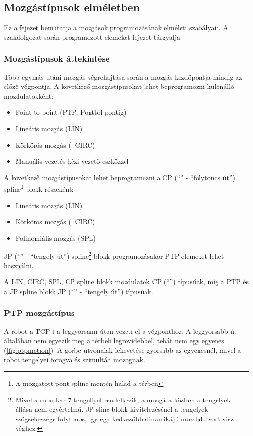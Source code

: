 \documentclass[../documentation.tex]{subfiles}
\begin{document}
\subsection{Mozgástípusok elméletben}
Ez a fejezet bemutatja a mozgások programozásának elméleti szabályait. A szakdolgozat során programozott elemeket  fejezet tárgyalja.

\subsubsection{Mozgástípusok áttekintése}
Több egymás utáni mozgás végrehajtása során a mozgás kezdőpontja mindig az előző végpontja.
A következő mozgástípusokat lehet beprogramozni különálló mozdulatokként:
\begin{itemize}
	\item Point-to-point (PTP, Ponttól pontig)
	\item Lineáris mozgás (LIN)
	\item Körkörös mozgás (, CIRC)
	\item Manuális vezetés kézi vezető eszközzel
\end{itemize}

A következő mozgástípusokat lehet beprogramozni a CP (``'' - ``folytonos út'') spline\footnote{A mozgatott pont spline mentén halad a térben} blokk\cite{sunrisemanual} részeként:
\begin{itemize}
	\item Lineáris mozgás (LIN)
	\item Körkörös mozgás (, CIRC)
	\item Polinomiális mozgás (SPL)
\end{itemize}

JP (``'' - ``tengely út'') spline\footnote{Mivel a robotkar 7 tengellyel rendelkezik, a mozgása közben a tengelyek állása nem egyértelmű. JP sline blokk kivitelezésénél a tengelyek szögsebessége folytonos, így egy kedvezőbb dinamikájú mozdulatsort visz véghez.} blokk\cite{sunrisemanual} programozásakor PTP elemeket lehet használni.

A LIN, CIRC, SPL, CP spline blokk mozdulatok CP (``'') típusúak, míg a PTP és a JP spline blokk JP (``'' - ``tengely út'') típusúak.

\subsubsection{PTP mozgástípus}
A robot a TCP-t a leggyorsann úton vezeti el a végponthoz. A leggyorsabb út általában nem egyezik meg a térbeli legrövidebbel, tehát nem egy egyenes (\ref{fig:ptpmotion}). A görbe útvonalak lekövetése gyorsabb az egyenesnél, mivel a robot tengelyei forogva és szimultán mozognak.
\end{document}
